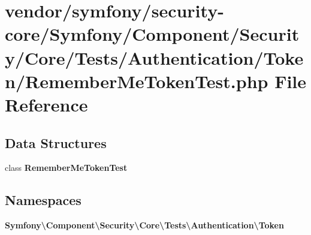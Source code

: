 \section{vendor/symfony/security-\/core/\+Symfony/\+Component/\+Security/\+Core/\+Tests/\+Authentication/\+Token/\+Remember\+Me\+Token\+Test.php File Reference}
\label{_remember_me_token_test_8php}
\subsection*{Data Structures}
\begin{DoxyCompactItemize}
\item 
class {\bf Remember\+Me\+Token\+Test}
\end{DoxyCompactItemize}
\subsection*{Namespaces}
\begin{DoxyCompactItemize}
\item 
 {\bf Symfony\textbackslash{}\+Component\textbackslash{}\+Security\textbackslash{}\+Core\textbackslash{}\+Tests\textbackslash{}\+Authentication\textbackslash{}\+Token}
\end{DoxyCompactItemize}
